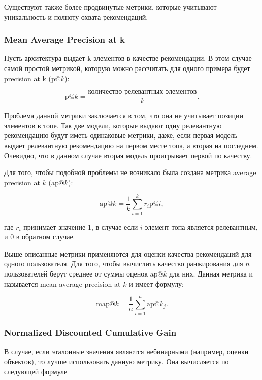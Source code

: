 \documentclass[bachelor, och, coursework]{SCWorks}
\begin{document}
Существуют также более продвинутые метрики, которые учитывают уникальность и полноту охвата рекомендаций.

\subsubsection{Mean Average Precision at k}
Пусть архитектура выдает k элементов в качестве рекомендации. В этом случае самой простой метрикой, которую
можно рассчитать для одного примера будет precision at k (p$@k$):

\begin{equation}
    \text{p}@k = \frac{\text{количество релевантных элементов}}{k}.
\end{equation}

Проблема данной метрики заключается в том, что она не учитывает позиции элементов в топе. Так две модели, которые
выдают одну релевантную рекомендацию будут иметь одинаковые метрики, даже, если первая модель выдает релевантную
рекомендацию на первом месте топа, а вторая на последнем. Очевидно, что в данном случае вторая модель проигрывает
первой по качеству.

Для того, чтобы подобной проблемы не возникало была создана метрика average precision at $k$ (ap$@k$):

\begin{equation}
    \text{ap}@k = \frac{1}{k}\sum_{i=1}^{k}r_i\text{p}@i,
\end{equation}

где $r_i$ принимает значение 1, в случае если $i$ элемент топа является релевантным, и 0 в обратном случае.

Выше описанные метрики применяются для оценки качества рекомендаций для одного пользователя. Для того, чтобы
вычислить качество ранжирования для $n$ пользователей берут среднее от суммы оценок ap$@k$ для них. Данная метрика
и называется mean average precision at $k$ и имеет формулу:

\begin{equation}
    \text{map}@k = \frac{1}{n}\sum_{i=1}^{n}\text{ap}@k_j.
\end{equation}

\subsubsection{Normalized Discounted Cumulative Gain}
В случае, если эталонные значения являются небинарными (например, оценки объектов), то лучше использовать
данную метрику. Она вычисляется по следующей формуле
\end{document}
